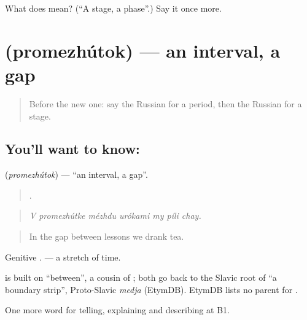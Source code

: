 \begin{tcolorbox}[breakable,colback=teal!4,colframe=teal!35!black,title={Before you move on}]
What does  mean? (\textquotedblleft{}A stage, a phase\textquotedblright{}.) Say it once more.
\end{tcolorbox}
\section[\texorpdfstring{\ru{промежуток} (promezhútok)}{промежуток (promezhútok)}]{ (promezhútok) — an interval, a gap}

\label{lesson:RU-C276-promezhutok}



\begin{quote}
Before the new one: say the Russian for a period, then the Russian for a stage.
\end{quote}

\subsection*{You'll want to know: }
\textbf{} (\emph{promezhútok}) — \textquotedblleft{}an interval, a gap\textquotedblright{}.

\begin{quote}
      .
\end{quote}

\begin{quote}
\emph{V promezhútke mézhdu urókami my píli chay.}
\end{quote}

\begin{quote}
In the gap between lessons we drank tea.
\end{quote}

Genitive \emph{}. \emph{ } — a stretch of time.

\begin{cousinweb}
\emph{} is built on \emph{} \textquotedblleft{}between\textquotedblright{}, a cousin of \emph{}; both go back to the Slavic root of \emph{} \textquotedblleft{}a boundary strip\textquotedblright{}, Proto-Slavic \emph{medja} (EtymDB). EtymDB lists no parent for \emph{}.
\end{cousinweb}

\begin{grammarlens}[title={What you've built}]
One more word for telling, explaining and describing at B1.
\end{grammarlens}


